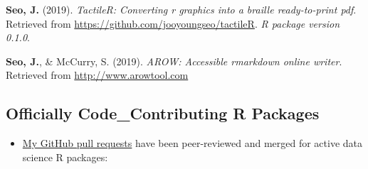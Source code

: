 \documentclass[11pt, a4paper]{awesome-cv}
\providecommand{\tightlist}{%
	\setlength{\itemsep}{0pt}\setlength{\parskip}{0pt}}
\begin{document}
\leavevmode\hypertarget{ref-R-tactileR}{}%
\textbf{Seo, J.} (2019). \emph{TactileR: Converting r graphics into a
braille ready-to-print pdf}. Retrieved from
\url{https://github.com/jooyoungseo/tactileR}. \emph{R package version
0.1.0}.

\leavevmode\hypertarget{ref-webrender}{}%
\textbf{Seo, J.}, \& McCurry, S. (2019). \emph{AROW: Accessible
rmarkdown online writer}. Retrieved from \url{http://www.arowtool.com}

\hypertarget{officially-code_contributing-r-packages}{%
\subsection{Officially Code\_Contributing R
Packages}\label{officially-code_contributing-r-packages}}

\begin{itemize}
\tightlist
\item
  \href{https://github.com/pulls?q=is\%3Apr+author\%3Ajooyoungseo+archived\%3Afalse+is\%3Aclosed}{My
  GitHub pull requests} have been peer-reviewed and merged for active
  data science R packages:
\end{itemize}
\end{document}
